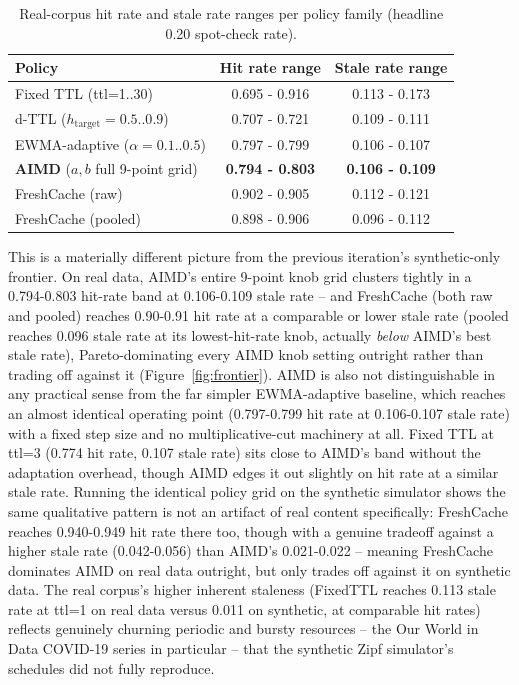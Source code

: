 \documentclass[11pt,letterpaper]{article}
\begin{document}
\begin{table}[!htbp]
\centering
\caption{Real-corpus hit rate and stale rate ranges per policy family (headline 0.20 spot-check rate).}
\label{tab:realdata}
\begin{tabular}{lcc}
\toprule
Policy & Hit rate range & Stale rate range \\
\midrule
Fixed TTL (ttl=1..30) & 0.695 - 0.916 & 0.113 - 0.173 \\
d-TTL ($h_{\text{target}}=0.5..0.9$) & 0.707 - 0.721 & 0.109 - 0.111 \\
EWMA-adaptive ($\alpha=0.1..0.5$) & 0.797 - 0.799 & 0.106 - 0.107 \\
\textbf{AIMD} ($a,b$ full 9-point grid) & \textbf{0.794 - 0.803} & \textbf{0.106 - 0.109} \\
FreshCache (raw) & 0.902 - 0.905 & 0.112 - 0.121 \\
FreshCache (pooled) & 0.898 - 0.906 & 0.096 - 0.112 \\
\bottomrule
\end{tabular}
\end{table}

This is a materially different picture from the previous iteration's synthetic-only frontier. On real
data, AIMD's entire 9-point knob grid clusters tightly in a 0.794-0.803 hit-rate band at 0.106-0.109 stale
rate -- and FreshCache (both raw and pooled) reaches 0.90-0.91 hit rate at a comparable or lower stale rate
(pooled reaches 0.096 stale rate at its lowest-hit-rate knob, actually \emph{below} AIMD's best stale rate),
Pareto-dominating every AIMD knob setting outright rather than trading off against it (Figure~\ref{fig:frontier}). AIMD is also not distinguishable in any practical sense from the far simpler
EWMA-adaptive baseline, which reaches an almost identical operating point (0.797-0.799 hit rate at
0.106-0.107 stale rate) with a fixed step size and no multiplicative-cut machinery at all. Fixed TTL at
ttl=3 (0.774 hit rate, 0.107 stale rate) sits close to AIMD's band without the adaptation overhead,
though AIMD edges it out slightly on hit rate at a similar stale rate. Running the identical policy grid
on the synthetic simulator shows the same qualitative pattern is not an artifact of real content
specifically: FreshCache reaches 0.940-0.949 hit rate there too, though with a genuine tradeoff against a
higher stale rate (0.042-0.056) than AIMD's 0.021-0.022 -- meaning FreshCache dominates AIMD on real data
outright, but only trades off against it on synthetic data. The real corpus's higher inherent staleness
(FixedTTL reaches 0.113 stale rate at ttl=1 on real data versus 0.011 on synthetic, at comparable hit
rates) reflects genuinely churning periodic and bursty resources -- the Our World in Data COVID-19 series
in particular -- that the synthetic Zipf simulator's schedules did not fully reproduce.
\end{document}
